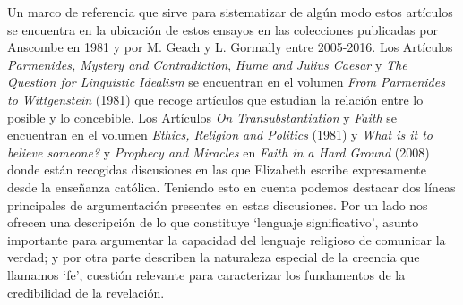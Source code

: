 Un marco de referencia que sirve para sistematizar de algún modo estos artículos se encuentra en la ubicación de estos ensayos en las colecciones publicadas por Anscombe en 1981 y por M. Geach y L. Gormally entre 2005-2016. Los Artículos \emph{Parmenides, Mystery and Contradiction}, \emph{Hume and Julius Caesar} y \emph{The Question for Linguistic Idealism} se encuentran en el volumen \emph{From Parmenides to Wittgenstein} (1981) que recoge artículos que estudian la relación entre lo posible y lo concebible. Los Artículos \emph{On Transubstantiation} y \emph{Faith} se encuentran en el volumen \emph{Ethics, Religion and Politics} (1981) y \emph{What is it to believe someone?} y \emph{Prophecy and Miracles} en \emph{Faith in a Hard Ground} (2008) donde están recogidas discusiones en las que Elizabeth escribe expresamente desde la enseñanza católica. Teniendo esto en cuenta podemos destacar dos líneas principales de argumentación presentes en estas discusiones. Por un lado nos ofrecen una descripción de lo que constituye `lenguaje significativo', asunto importante para argumentar la capacidad del lenguaje religioso de comunicar la verdad; y por otra parte describen la naturaleza especial de la creencia que llamamos `fe', cuestión relevante para caracterizar los fundamentos de la credibilidad de la revelación.

